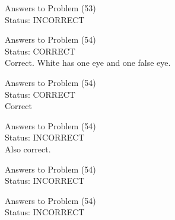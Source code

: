 \documentclass[11pt]{article}
\begin{document}
\begin{minipage}[t]{0.5\textwidth}
  {\centering
  
  Answers to Problem (53)\\
  Status: INCORRECT\\
  
  }
\end{minipage}
\begin{minipage}[t]{0.5\textwidth}
  {\centering
  
  Answers to Problem (54)\\
  Status: CORRECT\\
  Correct. White has one eye and one false eye.\\
  }
\end{minipage}
\begin{minipage}[t]{0.5\textwidth}
  {\centering
  
  Answers to Problem (54)\\
  Status: CORRECT\\
  Correct\\
  }
\end{minipage}
\begin{minipage}[t]{0.5\textwidth}
  {\centering
  
  Answers to Problem (54)\\
  Status: INCORRECT\\
  Also correct.\\
  }
\end{minipage}
\begin{minipage}[t]{0.5\textwidth}
  {\centering
  
  Answers to Problem (54)\\
  Status: INCORRECT\\
  
  }
\end{minipage}
\begin{minipage}[t]{0.5\textwidth}
  {\centering
  
  Answers to Problem (54)\\
  Status: INCORRECT\\
  
  }
\end{minipage}
\end{document}
